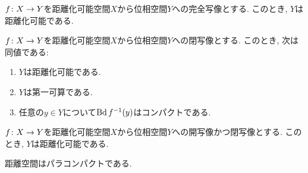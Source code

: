 \documentclass[uplatex, dvipdfmx, a4paper, 12pt, class=jsbook, crop=false]{standalone}
\begin{document}
\begin{proposition}
	$ f\colon X\to Y $を距離化可能空間$ X $から位相空間$ Y $への完全写像とする.
	このとき, $ Y $は距離化可能である.
\end{proposition}

\begin{theorem}
	$ f\colon X\to Y $を距離化可能空間$ X $から位相空間$ Y $への閉写像とする.
	このとき, 次は同値である:
	\begin{enumerate}
		\item $ Y $は距離化可能である.
		\item $ Y $は第一可算である.
		\item 任意の$ y \in Y $について$ \topbd \mapinvpt{f}{y} $はコンパクトである.
	\end{enumerate}
\end{theorem}

\begin{proposition}
	$ f\colon X\to Y $を距離化可能空間$ X $から位相空間$ Y $への開写像かつ閉写像とする.
	このとき, $ Y $は距離化可能である.
\end{proposition}

\begin{theorem}
	\label{met0002}
	距離空間はパラコンパクトである.
\end{theorem}
\end{document}
